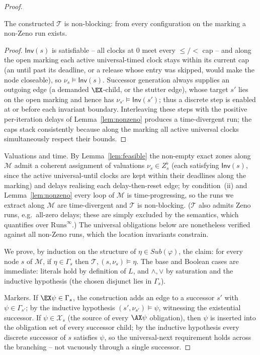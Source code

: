 \begin{proof}
\begin{lemma}\label{lem:nonblock}
The constructed $\mathcal{T}$ is non-blocking: from every configuration on the marking a non-Zeno run exists.
\end{lemma}
\begin{proof}
$\mathsf{Inv}(s)$ is satisfiable -- all clocks at $0$ meet every $\le/<$ cap -- and along the open marking each active universal-timed clock stays within its current cap (an until past its deadline, or a release whose entry was skipped, would make the node closeable), so $\nu_s\models\mathsf{Inv}(s)$. Successor generation always supplies an outgoing edge (a demanded $\EX$-child, or the stutter edge), whose target $s'$ lies on the open marking and hence has $\nu_{s'}\models\mathsf{Inv}(s')$; thus a discrete step is enabled at or before each invariant boundary. Interleaving these steps with the positive per-iteration delays of Lemma~\ref{lem:nonzeno} produces a time-divergent run; the caps stack consistently because along the marking all active universal clocks simultaneously respect their bounds.
\end{proof}

{Valuations and time.} By Lemma~\ref{lem:feasible} the non-empty exact zones along $\mathcal{M}$ admit a coherent assignment of valuations $\nu_s\in Z_s^{\flat}$ (each satisfying $\mathsf{Inv}(s)$, since the active universal-until clocks are kept within their deadlines along the marking) and delays realising each delay-then-reset edge; by condition~(ii) and Lemma~\ref{lem:nonzeno} every loop of $\mathcal{M}$ is time-progressing, so the runs we extract along $\mathcal{M}$ are time-divergent and $\mathcal{T}$ is non-blocking. ($\mathcal{T}$ also admits Zeno runs, e.g.\ all-zero delays; these are simply excluded by the semantics, which quantifies over $\mathrm{Runs}^\infty$.) The universal obligations below are nonetheless verified against {all} non-Zeno runs, which the location invariants constrain.


We prove, by induction on the structure of $\eta\in Sub(\varphi)$, the claim: for every node $s$ of $\mathcal{M}$, if $\eta\in\Gamma_s$ then $\mathcal{T},(s,\nu_s)\models\eta$. The base and Boolean cases are immediate: literals hold by definition of $L$, and $\land,\lor$ by saturation and the inductive hypothesis (the chosen disjunct lies in $\Gamma_s$).

{Markers.} If $\EX\psi\in\Gamma_s$, the construction adds an edge to a successor $s'$ with $\psi\in\Gamma_{s'}$; by the inductive hypothesis $(s',\nu_{s'})\models\psi$, witnessing the existential successor. If $\psi\in\mathcal{X}_s$ (the source of every $\AX\psi$ obligation), then $\psi$ is inserted into the obligation set of {every} successor child; by the inductive hypothesis every discrete successor of $s$ satisfies $\psi$, so the universal-next requirement holds across the branching -- not vacuously through a single successor.


\end{proof}

